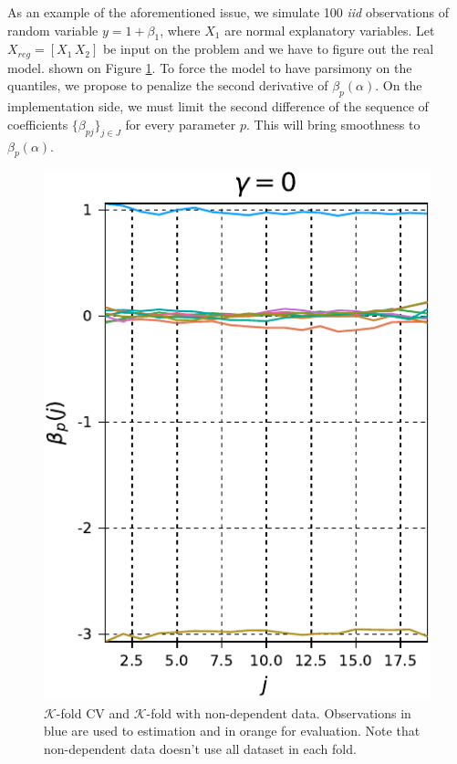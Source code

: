 As an example of the aforementioned issue, we simulate 100 \textit{iid} observations of random variable $y= 1 + \beta_1 $, where $X_1$ are normal explanatory variables. Let $X_{reg} = [X_1 \, X_2]$ be input on the problem and we have to figure out the real model.   shown on Figure \ref{fig:lasso-selection-normal}.
To force the model to have parsimony on the quantiles, we propose to penalize the second derivative of $\beta_p(\alpha)$. 
On the implementation side, we must limit the second difference of the sequence of coefficients $\{\beta_{pj}\}_{j \in J}$ for every parameter $p$. This will bring smoothness to $\beta_p(\alpha)$.
\begin{figure}
	\centering
	\includegraphics[width=0.5\linewidth]{Images/Lambda10-gamma03-cropped}
	\caption{$\mathcal{K}$-fold CV and $\mathcal{K}$-fold with non-dependent data. Observations in blue are used to estimation and in orange for evaluation. Note that non-dependent data doesn't use all dataset in each fold.}
	\label{fig:lasso-selection-normal}
\end{figure}

